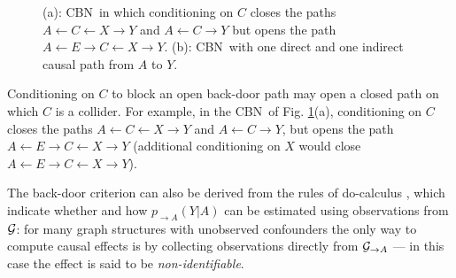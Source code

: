 \documentclass[runningheads]{llncs}
\newcommand{\figref}[1]{Fig. \ref{#1}}
\newcommand{\CBN}{CBN}
\begin{document}
\begin{figure}
\vskip-0.5cm
\vspace{-0.0cm}
\caption{(a): \CBN~in which conditioning on $C$ closes the paths $A\leftarrow C\leftarrow X \rightarrow Y$ and $A\leftarrow C\rightarrow Y$ but opens the path $A\leftarrow E\rightarrow C\leftarrow X \rightarrow Y$. (b): \CBN~with one direct and one indirect causal path from $A$ to $Y$.}
\label{fig:CBN}
\end{figure}
Conditioning on $C$ to block an open back-door path may open a closed path on which $C$ is a collider. For example, in the \CBN~of \figref{fig:CBN}(a), conditioning on $C$ closes the paths $A\leftarrow C\leftarrow X \rightarrow Y$ and $A\leftarrow C\rightarrow Y$,
but opens the path $A\leftarrow E\rightarrow C\leftarrow X \rightarrow Y$ (additional conditioning on $X$ would close $A\leftarrow E\rightarrow C\leftarrow X \rightarrow Y$).

The back-door criterion can also be derived from the rules of do-calculus \cite{pearl00causality,pearl16causal}, which indicate whether and how $p_{\rightarrow A}(Y|A)$ can be estimated using observations from ${\cal G}$: for many graph structures with unobserved confounders the only way to compute causal effects is by collecting observations directly from ${\cal G}_{\rightarrow A}$ --- in this case the effect is said to be \emph{non-identifiable}. 
\end{document}
